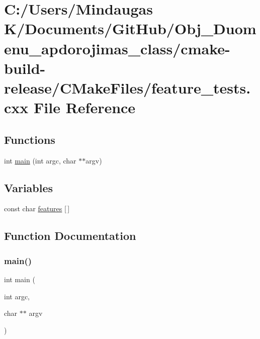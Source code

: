\hypertarget{cmake-build-release_2_c_make_files_2feature__tests_8cxx}{}\section{C\+:/\+Users/\+Mindaugas K/\+Documents/\+Git\+Hub/\+Obj\+\_\+\+Duomenu\+\_\+apdorojimas\+\_\+class/cmake-\/build-\/release/\+C\+Make\+Files/feature\+\_\+tests.cxx File Reference}
\label{cmake-build-release_2_c_make_files_2feature__tests_8cxx}
\subsection*{Functions}
\begin{DoxyCompactItemize}
\item 
int \mbox{\hyperlink{cmake-build-release_2_c_make_files_2feature__tests_8cxx_a3c04138a5bfe5d72780bb7e82a18e627}{main}} (int argc, char $\ast$$\ast$argv)
\end{DoxyCompactItemize}
\subsection*{Variables}
\begin{DoxyCompactItemize}
\item 
const char \mbox{\hyperlink{cmake-build-release_2_c_make_files_2feature__tests_8cxx_a1582568e32f689337602a16bf8a5bff0}{features}} \mbox{[}$\,$\mbox{]}
\end{DoxyCompactItemize}


\subsection{Function Documentation}
\mbox{\label{cmake-build-release_2_c_make_files_2feature__tests_8cxx_a3c04138a5bfe5d72780bb7e82a18e627}} 
\subsubsection{\texorpdfstring{main()}{main()}}
{\footnotesize\ttfamily int main (\begin{DoxyParamCaption}\item[{int}]{argc,  }\item[{char $\ast$$\ast$}]{argv }\end{DoxyParamCaption})}



